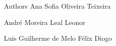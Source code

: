 \begin{DoxyAuthor}{Authors}
Ana Sofia Oliveira Teixeira 

André Moreira Leal Leonor 

Luis Guilherme de Melo Félix Diogo 
\end{DoxyAuthor}
